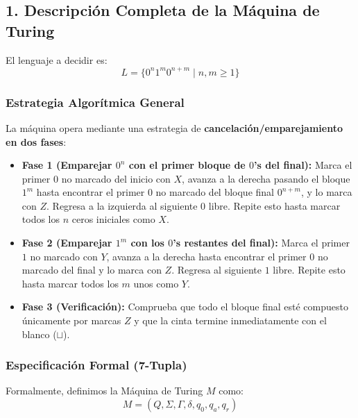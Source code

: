 \subsection*{1. Descripción Completa de la Máquina de Turing}

El lenguaje a decidir es:
\[ L = \{ 0^n 1^m 0^{n+m} \mid n, m \ge 1 \} \]

\subsubsection*{Estrategia Algorítmica General}
La máquina opera mediante una estrategia de \textbf{cancelación/emparejamiento en dos fases}:
\begin{itemize}[leftmargin=*]
    \item \textbf{Fase 1 (Emparejar $0^n$ con el primer bloque de $0$'s del final):} Marca el primer $0$ no marcado del inicio con $X$, avanza a la derecha pasando el bloque $1^m$ hasta encontrar el primer $0$ no marcado del bloque final $0^{n+m}$, y lo marca con $Z$. Regresa a la izquierda al siguiente $0$ libre. Repite esto hasta marcar todos los $n$ ceros iniciales como $X$.
    \item \textbf{Fase 2 (Emparejar $1^m$ con los $0$'s restantes del final):} Marca el primer $1$ no marcado con $Y$, avanza a la derecha hasta encontrar el primer $0$ no marcado del final y lo marca con $Z$. Regresa al siguiente $1$ libre. Repite esto hasta marcar todos los $m$ unos como $Y$.
    \item \textbf{Fase 3 (Verificación):} Comprueba que todo el bloque final esté compuesto únicamente por marcas $Z$ y que la cinta termine inmediatamente con el blanco ($\sqcup$).
\end{itemize}

\subsubsection*{Especificación Formal (7-Tupla)}

Formalmente, definimos la Máquina de Turing $M$ como:
\[ M = (Q, \Sigma, \Gamma, \delta, q_0, q_a, q_r) \]

